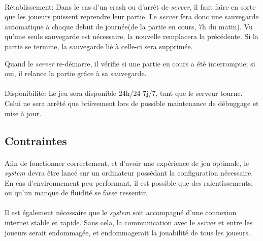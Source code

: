 \documentclass[a4paper,11pt]{report}
\begin{document}
\paragraph{}Rétablissement:  \newline
Dans le cas d'un crash ou d'arrêt de \textit{server}, il faut faire en sorte que les joueurs puissent reprendre leur partie. Le \textit{server} fera donc une sauvegarde automatique à chaque debut de journée(de la partie en cours, 7h du matin). 
Vu qu'une seule sauvegarde est nécessaire, la nouvelle remplacera la précédente.
Si la partie se termine, la sauvegarde lié à celle-ci sera supprimée.

Quand le \textit{server} re-démarre, il vérifie si une partie en cours a été interrompue; si oui, il relance la partie grâce à sa sauvegarde.

\paragraph{}Disponibilité:  \newline
Le jeu sera disponible 24h/24 7j/7, tant que le serveur tourne. Celui ne sera arrêté que brièvement lors de possible maintenance de débuggage et mise à jour.

\subsection{Contraintes}
\paragraph{}
Afin de fonctionner correctement, et d’avoir une expérience de jeu optimale, le \textit{system} devra être lancé sur un ordinateur possédant la configuration nécessaire.
En cas d’environnement peu performant, il est possible que des ralentissements, ou qu’un manque de fluidité se fasse ressentir.
\paragraph{}
Il est également nécessaire que le \textit{system} soit accompagné d’une connexion internet stable et rapide.
Sans cela, la communication avec le \textit{server} et entre les joueurs serait endommagée, et endommagerait la jouabilité de tous les joueurs.

\newpage
\end{document}

